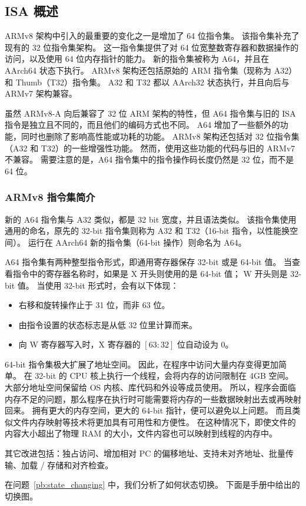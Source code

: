 \subsection{ISA 概述}

ARMv8 架构中引入的最重要的变化之一是增加了 64 位指令集。
该指令集补充了现有的 32 位指令集架构。
这一指令集提供了对 64 位宽整数寄存器和数据操作的访问，以及使用 64 位内存指针的能力。
新的指令集被称为 A64，并且在 AArch64 状态下执行。
ARMv8 架构还包括原始的 ARM 指令集（现称为 A32）和 Thumb（T32）指令集。
A32 和 T32 都以 AArch32 状态执行，并且向后与 ARMv7 架构兼容。

虽然 ARMv8-A 向后兼容了 32 位 ARM 架构的特性，但 A64 指令集与旧的 ISA 指令是独立且不同的，而且他们的编码方式也不同。
A64 增加了一些额外的功能，同时也删除了影响高性能或功耗的功能。
ARMv8 架构还包括对 32 位指令集（A32 和 T32）的一些增强性功能。
然而，使用这些功能的代码与旧的 ARMv7 不兼容。
需要注意的是，A64 指令集中的指令操作码长度仍然是 32 位，而不是 64 位。

\subsubsection{ARMv8 指令集简介}

新的 A64 指令集与 A32 类似，都是 32 bit 宽度，并且语法类似。
该指令集使用通用的命名，原先的 32-bit 指令集则称为 A32 和 T32（16-bit 指令，以性能换空间）。
运行在 AArch64 新的指令集（64-bit 操作）则命名为 A64。

A64 指令集有两种整型指令形式，即通用寄存器保存 32-bit 或是 64-bit 值。
当查看指令中的寄存器名称时，如果是 X 开头则使用的是 64-bit 值；
W 开头则是 32-bit 值。
当使用 32-bit 形式时，会有以下体现：
\begin{itemize}
  \item 右移和旋转操作止于 31 位，而非 63 位。
  \item 由指令设置的状态标志是从低 32 位里计算而来。
  \item 向 W 寄存器写入时，X 寄存器的 $[63:32]$ 位自动设为 0。
\end{itemize}

64-bit 指令集极大扩展了地址空间。
因此，在程序中访问大量内存变得更加简单。
在 32-bit 的 CPU 核上执行一个线程，会将内存的访问限制在 4GB 空间。
大部分地址空间保留给 OS 内核、库代码和外设等成员使用。
所以，程序会面临内存不足的问题，那么程序在执行时可能需要将内存的一些数据映射出去或再映射回来。
拥有更大的内存空间，更大的 64-bit 指针，便可以避免以上问题。
而且类似文件内存映射等技术将更加具有可用性和方便性。
在这种情况下，即使文件的内容大小超出了物理 RAM 的大小，文件内容也可以映射到线程的内存中。

其它改进包括：独占访问、增加相对 PC 的偏移地址、支持未对齐地址、批量传输、加载 / 存储和对齐检查。

在问题~\ref{pb:state_changing} 中，我们分析了如何状态切换。
下面是手册中给出的切换图。

